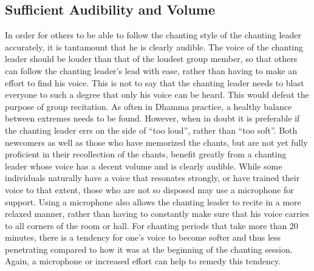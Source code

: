 \subsection*{Sufficient Audibility and Volume}
\begin{justify}
  In order for others to be able to follow the chanting style of the chanting leader accurately, it is tantamount that he is clearly audible. The voice of the chanting leader should be louder than that of the loudest group member, so that others can follow the chanting leader's lead with ease, rather than having to make an effort to find his voice. This is not to say that the chanting leader needs to blast everyone to such a degree that only his voice can be heard. This would defeat the purpose of group recitation. As often in Dhamma practice, a healthy balance between extremes needs to be found. However, when in doubt it is preferable if the chanting leader errs on the side of ``too loud'', rather than ``too soft''. Both newcomers as well as those who have memorized the chants, but are not yet fully proficient in their recollection of the chants, benefit greatly from a chanting leader whose voice has a decent volume and is clearly audible. While some individuals naturally have a voice that resonates strongly, or have trained their voice to that extent, those who are not so disposed may use a microphone for support. Using a microphone also allows the chanting leader to recite in a more relaxed manner, rather than having to constantly make sure that his voice carries to all corners of the room or hall. For chanting periods that take more than 20 minutes, there is a tendency for one's voice to become softer and thus less penetrating compared to how it was at the beginning of the chanting session. Again, a microphone or increased effort can help to remedy this tendency.
\end{justify}

